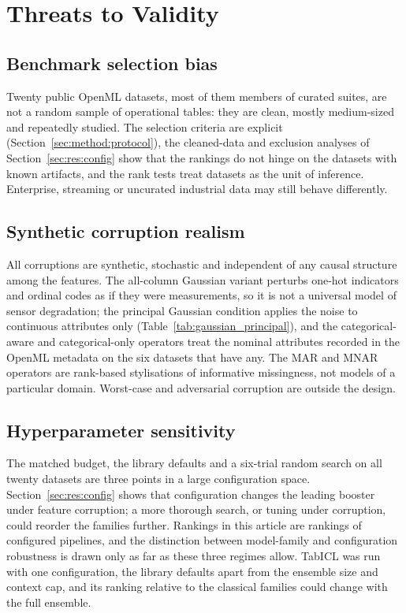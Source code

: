 \documentclass[pdflatex,sn-mathphys]{sn-jnl}
\theoremstyle{thmstyleone}
\theoremstyle{thmstyletwo}
\theoremstyle{thmstylethree}
\begin{document}
\section{Threats to Validity}\label{sec:threats}

\subsection{Benchmark selection bias}\label{sec:threats:selection}
Twenty public OpenML datasets, most of them members of curated suites, are not a random sample of operational tables: they are clean, mostly medium-sized and repeatedly studied. The selection criteria are explicit (Section~\ref{sec:method:protocol}), the cleaned-data and exclusion analyses of Section~\ref{sec:res:config} show that the rankings do not hinge on the datasets with known artifacts, and the rank tests treat datasets as the unit of inference. Enterprise, streaming or uncurated industrial data may still behave differently.

\subsection{Synthetic corruption realism}\label{sec:threats:realism}
All corruptions are synthetic, stochastic and independent of any causal structure among the features. The all-column Gaussian variant perturbs one-hot indicators and ordinal codes as if they were measurements, so it is not a universal model of sensor degradation; the principal Gaussian condition applies the noise to continuous attributes only (Table~\ref{tab:gaussian_principal}), and the categorical-aware and categorical-only operators treat the nominal attributes recorded in the OpenML metadata on the six datasets that have any. The MAR and MNAR operators are rank-based stylisations of informative missingness, not models of a particular domain. Worst-case and adversarial corruption are outside the design.

\subsection{Hyperparameter sensitivity}\label{sec:threats:hyper}
The matched budget, the library defaults and a six-trial random search on all twenty datasets are three points in a large configuration space. Section~\ref{sec:res:config} shows that configuration changes the leading booster under feature corruption; a more thorough search, or tuning under corruption, could reorder the families further. Rankings in this article are rankings of configured pipelines, and the distinction between model-family and configuration robustness is drawn only as far as these three regimes allow. TabICL was run with one configuration, the library defaults apart from the ensemble size and context cap, and its ranking relative to the classical families could change with the full ensemble.
\end{document}
